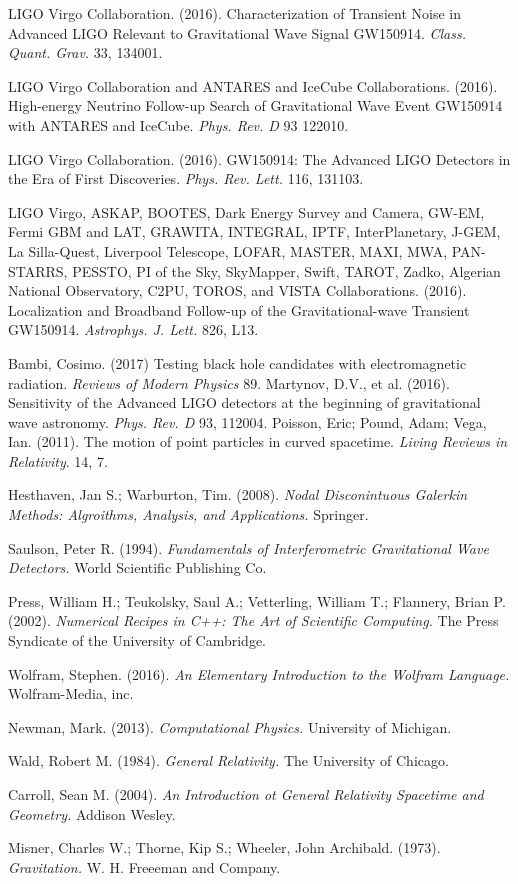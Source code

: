   LIGO Virgo Collaboration. (2016). Characterization of Transient Noise in Advanced LIGO Relevant to Gravitational Wave Signal GW150914. {\em Class. Quant. Grav.} 33, 134001.

  LIGO Virgo Collaboration and ANTARES and IceCube Collaborations. (2016). High-energy Neutrino Follow-up Search of Gravitational Wave Event GW150914 with ANTARES and IceCube. {\em Phys. Rev. D} 93 122010. 

  LIGO Virgo Collaboration. (2016). GW150914: The Advanced LIGO Detectors in the Era of First Discoveries. {\em Phys. Rev. Lett.} 116, 131103.

  LIGO Virgo, ASKAP, BOOTES, Dark Energy Survey and Camera, GW-EM, Fermi GBM and LAT, GRAWITA, INTEGRAL, IPTF, InterPlanetary, J-GEM, La Silla-Quest, Liverpool Telescope, LOFAR, MASTER, MAXI, MWA, PAN-STARRS, PESSTO, PI of the Sky, SkyMapper, Swift, TAROT, Zadko, Algerian National Observatory, C2PU, TOROS, and VISTA Collaborations. (2016). Localization and Broadband Follow-up of the Gravitational-wave Transient GW150914. {\em Astrophys. J. Lett.} 826, L13.
  
  Bambi, Cosimo. (2017) Testing black hole candidates with electromagnetic radiation. {\em Reviews of Modern Physics} 89.
  Martynov, D.V., et al. (2016). Sensitivity of the Advanced LIGO detectors at the beginning of gravitational wave astronomy. {\em Phys. Rev. D} 93, 112004.
  Poisson, Eric; Pound, Adam; Vega, Ian. (2011). The motion of point particles in curved spacetime. {\em Living Reviews in Relativity}. 14, 7. 

 Hesthaven, Jan S.; Warburton, Tim. (2008). {\em Nodal Disconintuous Galerkin Methods: Algroithms, Analysis, and Applications.} Springer.

 Saulson, Peter R. (1994). {\em Fundamentals of Interferometric Gravitational Wave Detectors.} World Scientific Publishing Co.

 Press, William H.; Teukolsky, Saul A.; Vetterling, William T.; Flannery, Brian P. (2002). {\em Numerical Recipes in C++: The Art of Scientific Computing.} The Press Syndicate of the University of Cambridge.

 Wolfram, Stephen. (2016). {\em An Elementary Introduction to the Wolfram Language.} Wolfram-Media, inc.

 Newman, Mark. (2013). {\em Computational Physics.} University of Michigan.

Wald, Robert M. (1984). {\em General Relativity.} The University of Chicago.

Carroll, Sean M. (2004). {\em An Introduction ot General Relativity Spacetime and Geometry.} Addison Wesley.

Misner, Charles W.; Thorne, Kip S.; Wheeler, John Archibald. (1973). {\em Gravitation.} W. H. Freeeman and Company. 


